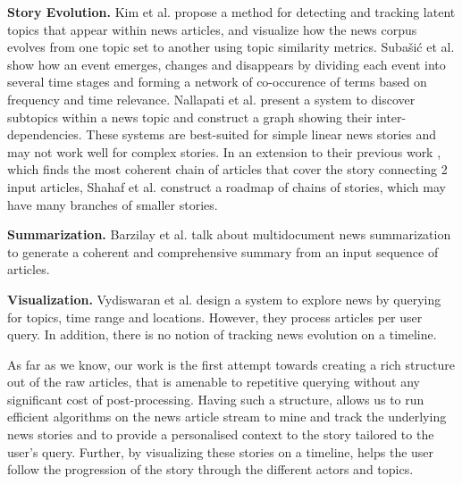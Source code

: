 \textbf{Story Evolution.}  Kim et al.\cite{Kim:2011:TCU:1964750.1964765} propose a method for detecting and tracking latent topics that appear within news articles, and visualize how the news corpus evolves from one topic set to another using topic similarity metrics. Suba\v{s}i\'{c} et al.\cite{subasic-ida:2013} %
 show how an event emerges, changes and disappears by dividing each event into several time stages and forming a network of co-occurence of terms based on frequency and time relevance. Nallapati et al.\cite
{Nallapati:2004:ETW:1031171.1031258, Mei:2005:DET:1081870.1081895} present a system to discover subtopics within a news topic and construct a graph showing their inter-dependencies. These systems are best-suited for simple linear news stories and may not work well for complex stories. In an extension to their previous work \cite{shahaf@kdd2010}, which finds the most coherent chain of articles that cover the story connecting 2 input articles, Shahaf et al.\cite{shahaf@www2012} construct a roadmap of chains of stories, which may have many branches of smaller stories. 

\textbf{Summarization.} Barzilay et al.\cite{Barzilay:2002:ISS:1622810.1622812} talk about multidocument news summarization to generate a coherent and comprehensive summary from an input sequence of articles.

\textbf{Visualization.} Vydiswaran et al.\cite{MEET:MEET14504801078} design a system to explore news by querying for topics, time range and locations. However, they process articles per user query. In addition, there is no notion of tracking news evolution on a timeline.

As far as we know, our work is the first attempt towards creating a rich structure out of the raw articles, that is amenable to repetitive querying without any significant cost of post-processing. Having such a structure, allows us to run efficient algorithms on the news article stream to mine and track the underlying news stories and to provide a personalised context to the story tailored to the user's query. Further, by visualizing these stories on a timeline, helps the user follow the progression of the story through the different actors and topics.
